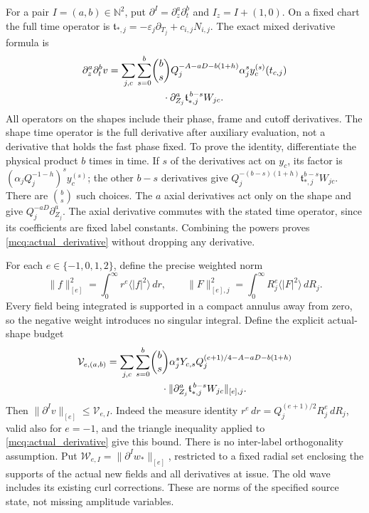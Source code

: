 For a pair \(I=(a,b)\in\mathbb N^2\), put
\(\partial^I=\partial_z^a\partial_t^b\) and
\(I_z=I+(1,0)\). On a fixed chart the full time operator is
\(\mathfrak t_{*,j}=-\varepsilon_j\partial_{T_j}+c_{i,j}N_{i,j}\).
The exact mixed derivative formula is
\begin{equation}\label{mcq:actual_derivative}
\begin{split}
 \partial_z^a\partial_t^b v
 =\sum_{j,c}\sum_{s=0}^b&
 \binom bs Q_j^{-A-aD-b(1+h)}\alpha_j^s
 y_c^{(s)}(t_{c,j})\\
 &\hspace{4mm}\cdot
 \partial_{Z_j}^a\mathfrak t_{*,j}^{\,b-s}W_{jc}.
\end{split}
\end{equation}
All operators on the shapes include their phase, frame and cutoff
derivatives. The shape time operator is the full derivative after
auxiliary evaluation, not a derivative that holds the fast phase fixed.
To prove the identity, differentiate the physical product \(b\) times
in time. If \(s\) of the derivatives act on \(y_c\), its factor is
\((\alpha_jQ_j^{-1-h})^sy_c^{(s)}\); the other \(b-s\) derivatives
give \(Q_j^{-(b-s)(1+h)}\mathfrak t_{*,j}^{b-s}W_{jc}\).
There are \(\binom bs\) such choices. The \(a\) axial derivatives act
only on the shape and give \(Q_j^{-aD}\partial_{Z_j}^a\).
The axial derivative commutes with the stated time operator, since
its coefficients are fixed label constants. Combining the powers proves
\eqref{mcq:actual_derivative} without dropping any derivative.

For each \(e\in\{-1,0,1,2\}\), define the precise weighted norm
\[
 \|f\|_{[e]}^2=\int_0^\infty r^e\langle |f|^2\rangle\,dr,\qquad
 \|F\|_{[e],j}^2=\int_0^\infty R_j^e\langle |F|^2\rangle\,dR_j.
\]
Every field being integrated is supported in a compact annulus away
from zero, so the negative weight introduces no singular integral.
Define the explicit actual-shape budget
\begin{equation}\label{mcq:V}
\begin{split}
 \mathcal V_{e,(a,b)}
 =\sum_{j,c}\sum_{s=0}^b&
 \binom bs \alpha_j^sY_{c,s}
 Q_j^{(e+1)/4-A-aD-b(1+h)}\\
 &\hspace{4mm}\cdot
 \|\partial_{Z_j}^a\mathfrak t_{*,j}^{\,b-s}W_{jc}\|_{[e],j}.
\end{split}
\end{equation}
Then \(\|\partial^I v\|_{[e]}\le\mathcal V_{e,I}\).
Indeed the measure identity
\(r^e\,dr=Q_j^{(e+1)/2}R_j^e\,dR_j\), valid also for \(e=-1\),
and the triangle inequality applied to \eqref{mcq:actual_derivative}
give this bound. There is no inter-label orthogonality assumption.
Put \(\mathcal W_{e,I}=\|\partial^I w_*\|_{[e]}\), restricted to a
fixed radial set enclosing the supports of the actual new fields
and all derivatives at issue. The old wave includes its existing curl
corrections. These are norms of the specified source state, not missing
amplitude variables.

